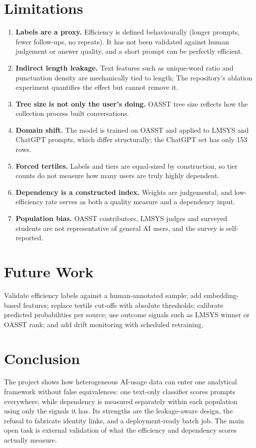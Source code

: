 \documentclass[11pt,a4paper]{article}
\renewcommand{\_}{\textunderscore\hspace{0pt}}
\newif\ifhasresults
\newcommand{\NChatgpt}{153}
\begin{document}
\section{Limitations}
\begin{enumerate}
  \item \textbf{Labels are a proxy.} Efficiency is defined behaviourally (longer prompts, fewer follow-ups, no repeats). It has not been validated against human judgement or answer quality, and a short prompt can be perfectly efficient.
  \item \textbf{Indirect length leakage.} Text features such as unique-word ratio and punctuation density are mechanically tied to length; \ifhasresults Table~\ref{tab:ablation} quantifies the effect but cannot remove it.\else The repository's ablation experiment quantifies the effect but cannot remove it.\fi
  \item \textbf{Tree size is not only the user's doing.} OASST tree size reflects how the collection process built conversations.
  \item \textbf{Domain shift.} The model is trained on OASST and applied to LMSYS and ChatGPT prompts, which differ structurally; the ChatGPT set has only \NChatgpt{} rows.
  \item \textbf{Forced tertiles.} Labels and tiers are equal-sized by construction, so tier counts do not measure how many users are truly highly dependent.
  \item \textbf{Dependency is a constructed index.} Weights are judgemental, and low-efficiency rate serves as both a quality measure and a dependency input.
  \item \textbf{Population bias.} OASST contributors, LMSYS judges and surveyed students are not representative of general AI users, and the survey is self-reported.
\end{enumerate}

\section{Future Work}
Validate efficiency labels against a human-annotated sample; add embedding-based features; replace tertile cut-offs with absolute thresholds; calibrate predicted probabilities per source; use outcome signals such as LMSYS winner or OASST rank; and add drift monitoring with scheduled retraining.

\section{Conclusion}
The project shows how heterogeneous AI-usage data can enter one analytical framework without false equivalences: one text-only classifier scores prompts everywhere, while dependency is measured separately within each population using only the signals it has. Its strengths are the leakage-aware design, the refusal to fabricate identity links, and a deployment-ready batch job. The main open task is external validation of what the efficiency and dependency scores actually measure.
\end{document}
